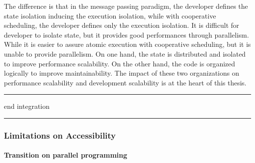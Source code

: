 The difference is that in the message passing paradigm, the developer defines the state isolation inducing the execution isolation, while with cooperative scheduling, the developer defines only the execution isolation.
It is difficult for developer to isolate state, but it provides good performances through parallelism.
While it is easier to assure atomic execution with cooperative scheduling, but it is unable to provide parallelism.
On one hand, the state is distributed and isolated to improve performance scalability.
On the other hand, the code is organized logically to improve maintainability.
The impact of these two organizations on performance scalability and development scalability is at the heart of this thesis.

\begin{center}
\rule{3cm}{0.4pt}
end integration
\rule{3cm}{0.4pt}
\end{center}


\subsubsection{Limitations on Accessibility}

\paragraph{Transition on parallel programming}

\endinput

\subsubsection{Modularity based on Design Decisions}

Designing Software for ease of extension and contraction \cite{Parnas1979}

Design Rules: The Power of Modularity Volume 1 \cite{Baldwin1999}
A reference book, but I can't get it.


Promises 
\cite{Liskov1988}


What makes a great software engineer? \cite{Li2015}

